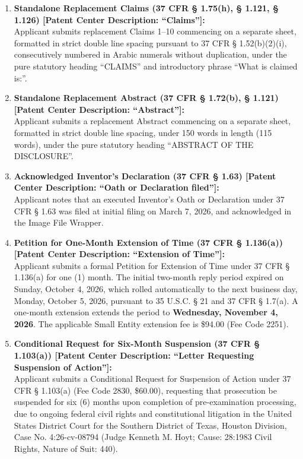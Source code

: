 \documentclass[11pt,letterpaper]{article}
\begin{document}
\begin{enumerate}[leftmargin=*]
    \item \textbf{Standalone Replacement Claims (37 CFR \S{} 1.75(h), \S{} 1.121, \S{} 1.126) [Patent Center Description: ``Claims'']:} \\
    Applicant submits replacement Claims 1--10 commencing on a separate sheet, formatted in strict double line spacing pursuant to 37 CFR \S{} 1.52(b)(2)(i), consecutively numbered in Arabic numerals without duplication, under the pure statutory heading ``CLAIMS'' and introductory phrase ``What is claimed is:''.

    \item \textbf{Standalone Replacement Abstract (37 CFR \S{} 1.72(b), \S{} 1.121) [Patent Center Description: ``Abstract'']:} \\
    Applicant submits a replacement Abstract commencing on a separate sheet, formatted in strict double line spacing, under 150 words in length (115 words), under the pure statutory heading ``ABSTRACT OF THE DISCLOSURE''.

    \item \textbf{Acknowledged Inventor's Declaration (37 CFR \S{} 1.63) [Patent Center Description: ``Oath or Declaration filed'']:} \\
    Applicant notes that an executed Inventor's Oath or Declaration under 37 CFR \S{} 1.63 was filed at initial filing on March 7, 2026, and acknowledged in the Image File Wrapper.

    \item \textbf{Petition for One-Month Extension of Time (37 CFR \S{} 1.136(a)) [Patent Center Description: ``Extension of Time'']:} \\
    Applicant submits a formal Petition for Extension of Time under 37 CFR \S{} 1.136(a) for one (1) month. The initial two-month reply period expired on Sunday, October 4, 2026, which rolled automatically to the next business day, Monday, October 5, 2026, pursuant to 35 U.S.C. \S{} 21 and 37 CFR \S{} 1.7(a). A one-month extension extends the period to \textbf{Wednesday, November 4, 2026}. The applicable Small Entity extension fee is \$94.00 (Fee Code 2251).

    \item \textbf{Conditional Request for Six-Month Suspension (37 CFR \S{} 1.103(a)) [Patent Center Description: ``Letter Requesting Suspension of Action'']:} \\
    Applicant submits a Conditional Request for Suspension of Action under 37 CFR \S{} 1.103(a) (Fee Code 2830, \$60.00), requesting that prosecution be suspended for six (6) months upon completion of pre-examination processing, due to ongoing federal civil rights and constitutional litigation in the United States District Court for the Southern District of Texas, Houston Division, Case No. 4:26-cv-08794 (Judge Kenneth M. Hoyt; Cause: 28:1983 Civil Rights, Nature of Suit: 440).
\end{enumerate}
\end{document}
